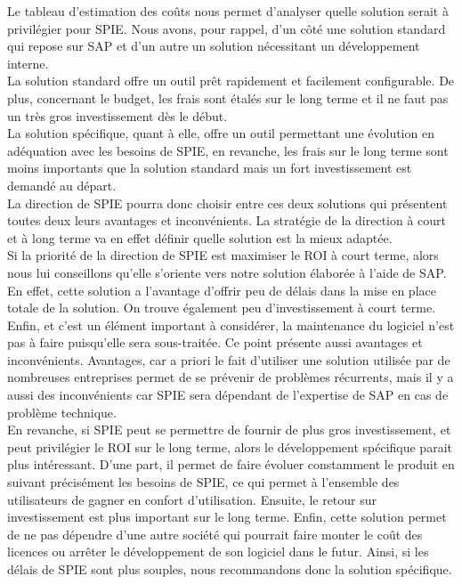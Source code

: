 
Le tableau d’estimation des coûts nous permet d’analyser quelle solution serait à privilégier pour SPIE. Nous avons, pour rappel, d’un côté une solution standard qui repose sur SAP et d’un autre un solution nécessitant un développement interne. \\

La solution standard offre un outil prêt rapidement et facilement configurable. De plus, concernant le budget, les frais sont étalés sur le long terme et il ne faut pas un très gros investissement dès le début. \\

La solution spécifique, quant à elle, offre un outil permettant une évolution en adéquation avec les besoins de SPIE, en revanche, les frais sur le long terme sont moins importants que la solution standard mais un fort investissement est demandé au départ. \\

La direction de SPIE pourra donc choisir entre ces deux solutions qui présentent toutes deux leurs avantages et inconvénients. La stratégie de la direction à court et à long terme va en effet définir quelle solution est la mieux adaptée. \\

Si la priorité de la direction de SPIE est maximiser le ROI à court terme, alors nous lui conseillons qu’elle s’oriente vers notre solution élaborée à l’aide de SAP. En effet, cette solution a l’avantage d’offrir peu de délais dans la mise en place totale de la solution. On trouve également peu d’investissement à court terme. Enfin, et c’est un élément important à considérer, la maintenance du logiciel n’est pas à faire puisqu’elle sera sous-traitée. Ce point présente aussi avantages et inconvénients. Avantages, car a priori le fait d’utiliser une solution utilisée par de nombreuses entreprises permet de se prévenir de problèmes récurrents, mais il y a aussi des inconvénients car SPIE sera dépendant de l’expertise de SAP en cas de problème technique. \\

En revanche, si SPIE peut se permettre de fournir de plus gros investissement, et peut privilégier le ROI sur le long terme, alors le développement spécifique parait plus intéressant.  D’une part, il permet de faire évoluer constamment le produit en suivant précisément les besoins de SPIE, ce qui permet à l’ensemble des utilisateurs de gagner en confort d’utilisation. Ensuite, le retour sur investissement est plus important sur le long terme. Enfin, cette solution permet de ne pas dépendre d’une autre société qui pourrait faire monter le coût des licences ou arrêter le développement de son logiciel dans le futur. Ainsi, si les délais de SPIE sont plus souples, nous recommandons donc la solution spécifique.